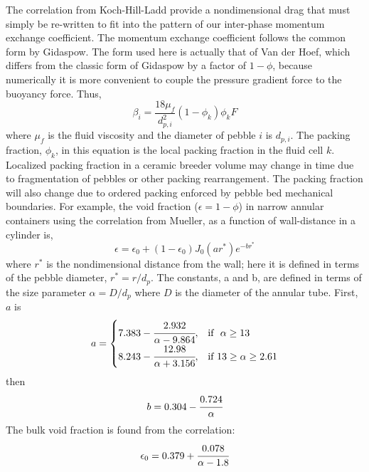 The correlation from Koch-Hill-Ladd provide a nondimensional drag that must simply be re-written to fit into the pattern of our inter-phase momentum exchange coefficient. The momentum exchange coefficient follows the common form by Gidaspow.\cite{gidaspow1994multiphase} The form used here is actually that of Van der Hoef, which differs from the classic form of Gidaspow by a factor of $1-\phi$, because numerically it is more convenient to couple the pressure gradient force to the buoyancy force.\cite{Hoef2005,Benyahia2006} Thus,
\begin{equation}\label{eq:interphase-momentum}
	\beta_{i} = \frac{18\mu_f}{d_{p,i}^2}(1-\phi_k)\phi_k F
\end{equation}
where $\mu_f$ is the fluid viscosity and the diameter of pebble $i$ is $d_{p,i}$. The packing fraction, $\phi_k$, in this equation is the local packing fraction in the fluid cell $k$. Localized packing fraction in a ceramic breeder volume may change in time due to fragmentation of pebbles or other packing rearrangement. The packing fraction will also change due to ordered packing enforced by pebble bed mechanical boundaries.\cite{Hunt1990,Benenati1962,Baird1958} For example, the void fraction ($\epsilon = 1-\phi$) in narrow annular containers using the correlation from Mueller, as a function of wall-distance in a cylinder is,\cite{Mueller1999}
\[
\epsilon = \epsilon_0 + (1-\epsilon_0)J_0(ar^*)e^{-br^*}
\]
where $r^*$ is the nondimensional distance from the wall; here it is defined in terms of the pebble diameter, $r^* = r/d_p$. The constants, a and b, are defined in terms of the size parameter $\alpha = D/d_p$ where $D$ is the diameter of the annular tube. First, $a$ is
\[
    a= 
\begin{cases}
    7.383 - \cfrac{2.932}{\alpha - 9.864}, & \text{if }\  \alpha \geq 13\\
    8.243 - \cfrac{12.98}{\alpha + 3.156}, & \text{if} \ 13 \geq \alpha \geq 2.61
\end{cases}
\]
then
\[
b = 0.304 - \cfrac{0.724}{\alpha}
\]
The bulk void fraction is found from the correlation:
\[
\epsilon_0 = 0.379 + \cfrac{0.078}{\alpha - 1.8}
\]


